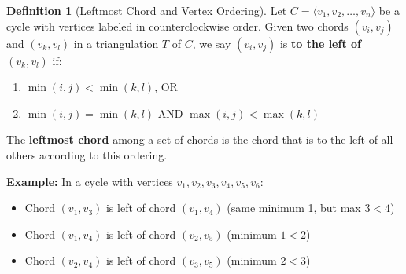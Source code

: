 \documentclass[12pt,a4paper]{article}
\theoremstyle{definition}
\newtheorem{definition}{Definition}
\theoremstyle{remark}
\begin{document}
\begin{definition}[Leftmost Chord and Vertex Ordering]
Let $C = \langle v_1, v_2, \ldots, v_n \rangle$ be a cycle with vertices labeled in counterclockwise order. Given two chords $(v_i, v_j)$ and $(v_k, v_l)$ in a triangulation $T$ of $C$, we say $(v_i, v_j)$ is \textbf{to the left of} $(v_k, v_l)$ if:
\begin{enumerate}
    \item $\min(i, j) < \min(k, l)$, OR
    \item $\min(i, j) = \min(k, l)$ AND $\max(i, j) < \max(k, l)$
\end{enumerate}

The \textbf{leftmost chord} among a set of chords is the chord that is to the left of all others according to this ordering.

\textbf{Example:} In a cycle with vertices $v_1, v_2, v_3, v_4, v_5, v_6$:
\begin{itemize}
    \item Chord $(v_1, v_3)$ is left of chord $(v_1, v_4)$ (same minimum 1, but max $3 < 4$)
    \item Chord $(v_1, v_4)$ is left of chord $(v_2, v_5)$ (minimum $1 < 2$)
    \item Chord $(v_2, v_4)$ is left of chord $(v_3, v_5)$ (minimum $2 < 3$)
\end{itemize}
\end{definition}
\end{document}

